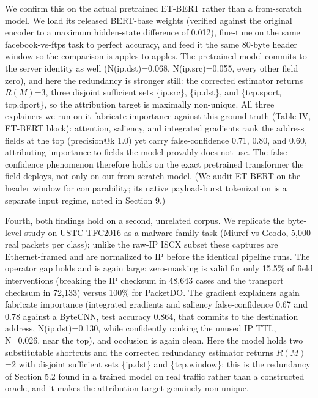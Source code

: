 \documentclass[journal]{IEEEtran}
\begin{document}
We confirm this on the actual pretrained ET-BERT \cite{lin2022etbert}
rather than a from-scratch model. We load its released BERT-base weights
(verified against the original encoder to a maximum hidden-state
difference of 0.012), fine-tune on the same facebook-vs-ftps task to
perfect accuracy, and feed it the same 80-byte header window so the
comparison is apples-to-apples. The pretrained model commits to the
server identity as well (N(ip.dst)=0.068, N(ip.src)=0.055, every other
field zero), and here the redundancy is stronger still: the corrected
estimator returns $R(M)$=3, three disjoint sufficient sets \{ip.src\},
\{ip.dst\}, and \{tcp.sport, tcp.dport\}, so the attribution target is
maximally non-unique. All three explainers we run on it fabricate
importance against this ground truth (Table IV, ET-BERT block):
attention, saliency, and integrated gradients rank the address fields at
the top (precision@k 1.0) yet carry false-confidence 0.71, 0.80, and
0.60, attributing importance to fields the model provably does not use.
The false-confidence phenomenon therefore holds on the exact pretrained
transformer the field deploys, not only on our from-scratch model. (We
audit ET-BERT on the header window for comparability; its native
payload-burst tokenization is a separate input regime, noted in Section
9.)

Fourth, both findings hold on a second, unrelated corpus. We replicate
the byte-level study on USTC-TFC2016 \cite{wang2017malware} as a
malware-family task (Miuref vs Geodo, 5,000 real packets per class);
unlike the raw-IP ISCX subset these captures are Ethernet-framed and are
normalized to IP before the identical pipeline runs. The operator gap
holds and is again large: zero-masking is valid for only 15.5\% of field
interventions (breaking the IP checksum in 48,643 cases and the
transport checksum in 72,133) versus 100\% for PacketDO. The gradient
explainers again fabricate importance (integrated gradients and saliency
false-confidence 0.67 and 0.78 against a ByteCNN, test accuracy 0.864,
that commits to the destination address, N(ip.dst)=0.130, while
confidently ranking the unused IP TTL, N=0.026, near the top), and
occlusion is again clean. Here the model holds two substitutable
shortcuts and the corrected redundancy estimator returns $R(M)$=2 with
disjoint sufficient sets \{ip.dst\} and \{tcp.window\}: this is the
redundancy of Section 5.2 found in a trained model on real traffic
rather than a constructed oracle, and it makes the attribution target
genuinely non-unique.
\end{document}
